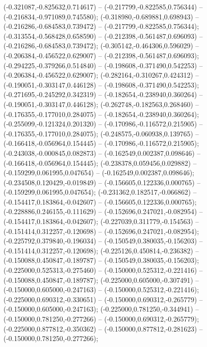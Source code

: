  (-0.321087,-0.825632,0.714617) -- (-0.217799,-0.822585,0.756344) -- (-0.216834,-0.971089,0.745580);
 (-0.318980,-0.689881,0.698943) -- (-0.216286,-0.684583,0.739472) -- (-0.217799,-0.822585,0.756344);
 (-0.313554,-0.568428,0.658590) -- (-0.212398,-0.561487,0.696093) -- (-0.216286,-0.684583,0.739472);
 (-0.305142,-0.464306,0.596029) -- (-0.206384,-0.456522,0.629007) -- (-0.212398,-0.561487,0.696093);
 (-0.294225,-0.379266,0.514840) -- (-0.198608,-0.371490,0.542253) -- (-0.206384,-0.456522,0.629007);
 (-0.282164,-0.310267,0.424312) -- (-0.190051,-0.303147,0.446128) -- (-0.198608,-0.371490,0.542253);
 (-0.271695,-0.245292,0.342319) -- (-0.182654,-0.238940,0.360264) -- (-0.190051,-0.303147,0.446128);
 (-0.262748,-0.182563,0.268460) -- (-0.176355,-0.177010,0.284075) -- (-0.182654,-0.238940,0.360264);
 (-0.255099,-0.121324,0.201320) -- (-0.170986,-0.116572,0.215905) -- (-0.176355,-0.177010,0.284075);
 (-0.248575,-0.060938,0.139765) -- (-0.166418,-0.056964,0.154445) -- (-0.170986,-0.116572,0.215905);
 (-0.243038,-0.000845,0.082873) -- (-0.162549,0.002387,0.098646) -- (-0.166418,-0.056964,0.154445);
 (-0.238378,0.059456,0.029882) -- (-0.159299,0.061995,0.047654) -- (-0.162549,0.002387,0.098646);
 (-0.234508,0.120429,-0.019849) -- (-0.156605,0.122336,0.000765) -- (-0.159299,0.061995,0.047654);
 (-0.231362,0.182517,-0.066862) -- (-0.154417,0.183864,-0.042607) -- (-0.156605,0.122336,0.000765);
 (-0.228886,0.246155,-0.111629) -- (-0.152696,0.247021,-0.082954) -- (-0.154417,0.183864,-0.042607);
 (-0.227039,0.311779,-0.154563) -- (-0.151414,0.312257,-0.120698) -- (-0.152696,0.247021,-0.082954);
 (-0.225792,0.379840,-0.196034) -- (-0.150549,0.380035,-0.156203) -- (-0.151414,0.312257,-0.120698);
 (-0.225126,0.450814,-0.236382) -- (-0.150088,0.450847,-0.189787) -- (-0.150549,0.380035,-0.156203);
 (-0.225000,0.525313,-0.275460) -- (-0.150000,0.525312,-0.221416) -- (-0.150088,0.450847,-0.189787);
 (-0.225000,0.605000,-0.307491) -- (-0.150000,0.605000,-0.247163) -- (-0.150000,0.525312,-0.221416);
 (-0.225000,0.690312,-0.330651) -- (-0.150000,0.690312,-0.265779) -- (-0.150000,0.605000,-0.247163);
 (-0.225000,0.781250,-0.344941) -- (-0.150000,0.781250,-0.277266) -- (-0.150000,0.690312,-0.265779);
 (-0.225000,0.877812,-0.350362) -- (-0.150000,0.877812,-0.281623) -- (-0.150000,0.781250,-0.277266);
